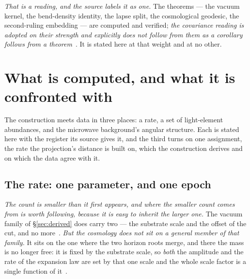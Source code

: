 \documentclass[11pt,a4paper]{article}
\theoremstyle{plain}
\theoremstyle{definition}
\begin{document}
\emph{That is a reading, and the source labels it as one.} The theorems --- the vacuum kernel, the
bend-density identity, the lapse split, the cosmological geodesic, the second-ruling embedding --- are
computed and verified; \emph{the covariance reading is adopted on their strength and explicitly does not
follow from them as a corollary follows from a theorem}~\cite{JanzenOperator}. It is stated here at that
weight and at no other.



\section{What is computed, and what it is confronted with}\label{sec:computed}

The construction meets data in three places: a rate, a set of light-element abundances, and the microwave
background's angular structure. Each is stated here with the register its source gives it, and the third
turns on one assignment, the rate the projection's distance is built on, which the construction derives and on which the data agree with it.

\subsection{The rate: one parameter, and one epoch}\label{sec:rate-epoch}

\emph{The count is smaller than it first appears, and where the smaller count comes from is worth following,
because it is easy to inherit the larger one.} The vacuum family of \S\ref{sec:derived} does carry two ---
the substrate scale and the offset of the cut, and no more~\cite{JanzenOperator}. \emph{But the cosmology
does not sit on a general member of that family.} It sits on the one where the two horizon roots merge, and
there the mass is no longer free: it is fixed by the substrate scale, so \emph{both} the amplitude and the
rate of the expansion law are set by that one scale and the whole scale factor is a single function of
it~\cite{JanzenCRcosmology}.
\end{document}

